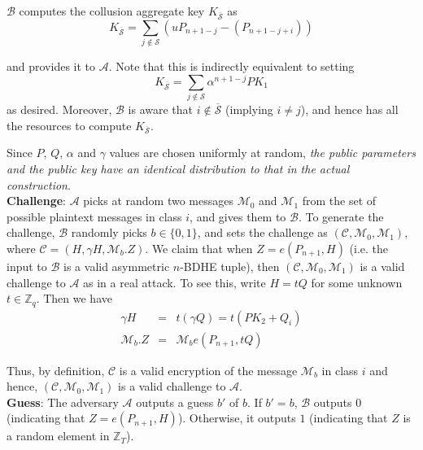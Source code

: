 \noindent $\mathcal{B}$ computes the collusion aggregate key $K_{\overline{\mathcal{S}}}$ as   
\begin{equation}
 K_{\overline{\mathcal{S}}} = \sum_{j\notin\mathcal{S}}({u}P_{n+1-j}-(P_{n+1-j+i})) \nonumber
\end{equation}

\noindent and provides it to $\mathcal{A}$. Note that this is indirectly equivalent to setting 
\begin{equation}
K_{\overline{\mathcal{S}}}=\sum_{j\notin\mathcal{S}}\alpha^{n+1-j}PK_1\nonumber
\end{equation}
\noindent as desired. Moreover, $\mathcal{B}$ is aware that $i\notin \overline{\mathcal{S}}$ (implying $i\neq j$), and hence has all the resources to compute $K_{\overline{\mathcal{S}}}$.

Since $P$, $Q$, $\alpha$ and $\gamma$ values are chosen uniformly at random, \emph{the public parameters and the public key have an identical distribution to that in the actual construction}.\\
 
\noindent \textbf{Challenge}: $\mathcal{A}$ picks at random two messages $\mathcal{M}_0$ and $\mathcal{M}_1$ from the set of possible plaintext messages in class $i$, and gives them to $\mathcal{B}$. To generate the challenge, $\mathcal{B}$ randomly picks $b\in\{0,1\}$, and sets the challenge as $(\mathcal{C},\mathcal{M}_0,\mathcal{M}_1)$, where $\mathcal{C}=(H,\gamma H,\mathcal{M}_b.Z)$. We claim that when $Z={e}(P_{n+1},H)$ (i.e. the input to $\mathcal{B}$ is a valid asymmetric $n$-BDHE tuple), then $(\mathcal{C},\mathcal{M}_0,\mathcal{M}_1)$ is a valid challenge to $\mathcal{A}$ as in a real attack. To see this, write $H=tQ$ for some unknown $t\in\mathbb{Z}_q$. Then we have 
\begin{eqnarray}
\gamma H&=& t(\gamma Q)=t(PK_2+Q_i)\nonumber \\
\mathcal{M}_b.Z&=&\mathcal{M}_b{e}(P_{n+1},tQ)\nonumber
\end{eqnarray}

\noindent Thus, by definition, $\mathcal{C}$ is a valid encryption of the message $\mathcal{M}_b$ in class $i$ and hence, $(\mathcal{C},\mathcal{M}_0,\mathcal{M}_1)$ is a valid challenge to $\mathcal{A}$. \\
 
\noindent \textbf{Guess}: The adversary $\mathcal{A}$ outputs a guess $b'$ of $b$. If $b' = b$, $\mathcal{B}$ outputs $0$ (indicating that $Z = {e}(P_{n+1},H)$). Otherwise, it outputs $1$ (indicating that $Z$ is a random element in $\mathbb{Z}_T$).\\

